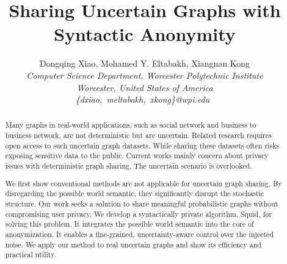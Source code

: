 \documentclass[10pt,conference,letterpaper]{IEEEtran}
\title{Sharing Uncertain Graphs with Syntactic Anonymity}
\author{%
{Dongqing Xiao, Mohamed Y. Eltabakh, Xiangnan Kong}%
\vspace{1.4mm}\\
\fontsize{10}{10}\selectfont\itshape
Computer Science Department, Worcester Polytechnic Institute \\
Worcester, United States of America\\
\fontsize{9}{9}\selectfont\ttfamily\upshape
\{dxiao,~meltabakh,~xkong\}@wpi.edu\
}
\theoremstyle{plain}
\begin{document}
\maketitle


%

\begin{abstract}  
Many graphs in real-world applications, such as social network and business to business network, are not deterministic but are uncertain. Related research requires open access to such uncertain graph datasets. While sharing these datasets often risks exposing sensitive data to the public. Current works mainly concern about privacy issues with deterministic graph sharing.  The uncertain scenario is overlooked. 

We first show conventional methods are not applicable for uncertain graph sharing. By disregarding the possible world semantic, they significantly disrupt the stochastic structure. Our work seeks a solution to share meaningful probabilistic graphs without compromising user privacy. We develop a syntactically private algorithm, Squid, for solving this problem. It integrates the possible world semantic into the core of anonymization. It enables a fine-grained, uncertainty-aware control over the injected noise. We apply our method to real uncertain graphs and show its efficiency and practical utility. 
\end{abstract}









% 

\end{document}

